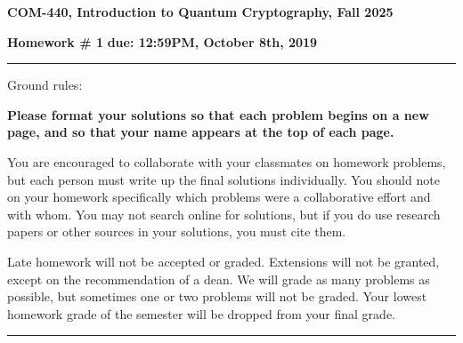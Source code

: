 \documentclass[12pt]{article}
\newcommand{\header}[1]{\begin{center} {\large\bf #1} \end{center}}
\begin{document}
\header{COM-440, Introduction to Quantum Cryptography, Fall 2025}
{\bf Homework \# 1} \hfill {\bf due: 12:59PM, October 8th, 2019}


\medskip

\hrule

\medskip 

Ground rules: 

{\bf Please
  format your solutions so that each problem begins on a new page, and
  so that your name appears at the top of each page.}

You are encouraged to collaborate with your classmates on
homework problems, but each person must write up the final solutions
individually. You should note on your homework specifically which
problems were a collaborative effort and with whom. You may not search
online for solutions, but if you do use research papers or other
sources in your solutions, you must cite them.

Late homework will not be accepted or graded. Extensions will not be granted, except on the recommendation of a dean. We will grade as many problems as possible, but sometimes one or two problems will not be graded. Your lowest homework grade of the semester will be dropped from your final grade.


\medskip

\hrule
\end{document}
